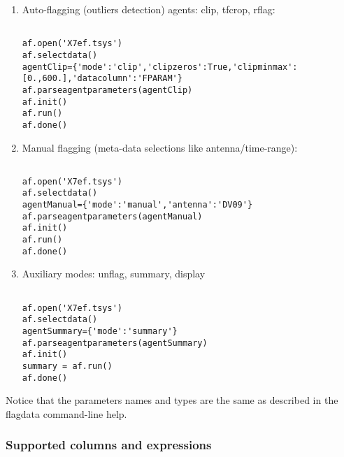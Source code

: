 \begin{enumerate}

\item Auto-flagging (outliers detection) agents: clip, tfcrop, rflag:

\begin{verbatim}

af.open('X7ef.tsys')
af.selectdata()
agentClip={'mode':'clip','clipzeros':True,'clipminmax':[0.,600.],'datacolumn':'FPARAM'}
af.parseagentparameters(agentClip)
af.init()
af.run()
af.done()

\end{verbatim}

\item Manual flagging (meta-data selections like antenna/time-range):

\begin{verbatim}

af.open('X7ef.tsys')
af.selectdata()
agentManual={'mode':'manual','antenna':'DV09'}
af.parseagentparameters(agentManual)
af.init()
af.run()
af.done() 

\end{verbatim}

\item Auxiliary modes: unflag, summary, display

\begin{verbatim}

af.open('X7ef.tsys')
af.selectdata()
agentSummary={'mode':'summary'}
af.parseagentparameters(agentSummary)
af.init()
summary = af.run()
af.done()

\end{verbatim}

\end{enumerate}

Notice that the parameters names and types are the same as described in the
flagdata command-line help.

\subsubsection{Supported columns and expressions}

